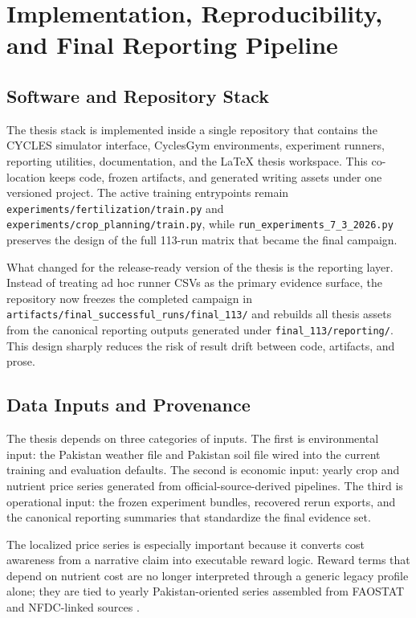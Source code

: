 \chapter{Implementation, Reproducibility, and Final Reporting Pipeline}

\section{Software and Repository Stack}

The thesis stack is implemented inside a single repository that contains the CYCLES simulator interface, CyclesGym environments, experiment runners, reporting utilities, documentation, and the LaTeX thesis workspace. This co-location keeps code, frozen artifacts, and generated writing assets under one versioned project. The active training entrypoints remain \texttt{experiments/fertilization/train.py} and \texttt{experiments/crop\_planning/train.py}, while \texttt{run\_experiments\_7\_3\_2026.py} preserves the design of the full 113-run matrix that became the final campaign.

What changed for the release-ready version of the thesis is the reporting layer. Instead of treating ad hoc runner CSVs as the primary evidence surface, the repository now freezes the completed campaign in \texttt{artifacts/final\_successful\_runs/final\_113/} and rebuilds all thesis assets from the canonical reporting outputs generated under \texttt{final\_113/reporting/}. This design sharply reduces the risk of result drift between code, artifacts, and prose.

\section{Data Inputs and Provenance}

The thesis depends on three categories of inputs. The first is environmental input: the Pakistan weather file and Pakistan soil file wired into the current training and evaluation defaults. The second is economic input: yearly crop and nutrient price series generated from official-source-derived pipelines. The third is operational input: the frozen experiment bundles, recovered rerun exports, and the canonical reporting summaries that standardize the final evidence set.

The localized price series is especially important because it converts cost awareness from a narrative claim into executable reward logic. Reward terms that depend on nutrient cost are no longer interpreted through a generic legacy profile alone; they are tied to yearly Pakistan-oriented series assembled from FAOSTAT and NFDC-linked sources \citep{faostatprices2026,nfdcprices2026}.

